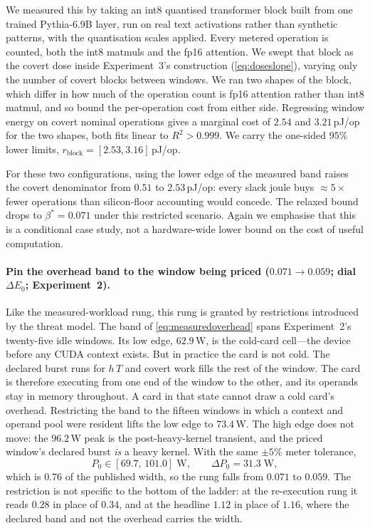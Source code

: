 \documentclass{article}
\theoremstyle{plain}
\theoremstyle{definition}
\theoremstyle{remark}
\begin{document}
We measured this by taking an int8 quantised transformer block built from one trained Pythia-6.9B
layer, run on real text activations rather than synthetic
patterns, with the quantisation scales applied. Every metered operation is
counted, both the int8 matmuls and the fp16 attention. We swept that block
as the covert dose inside Experiment~3's construction
(\cref{eq:doseslope}), varying only the number of covert blocks between
windows. We ran two shapes of the block, which differ in how much of the
operation count is fp16 attention rather than int8 matmul, and so bound the
per-operation cost from either side. Regressing window energy on covert nominal
operations gives a marginal cost of $2.54$ and $3.21$\,pJ/op for the two
shapes, both fits linear to $R^{2} > 0.999$. We carry the one-sided $95\%$ lower limits,
$r_{\mathrm{block}} = [2.53, 3.16]$\,pJ/op.

For these two configurations, using the lower edge of the measured band raises
the covert denominator from $0.51$ to $2.53$\,pJ/op: every slack joule buys
${\approx}5\times$ fewer operations than silicon-floor accounting would
concede. The relaxed bound drops to $\beta^{*} = 0.071$ under this restricted
scenario. Again we emphasise that this is a conditional case study, not a hardware-wide lower bound on
the cost of useful computation.

\paragraph{Pin the overhead band to the window being priced
($0.071 \to 0.059$; dial $\Delta E_0$; Experiment~2).}
Like the measured-workload rung, this rung is granted by restrictions introduced by the threat model. The band of \cref{eq:measuredoverhead} spans Experiment~2's
twenty-five idle windows.  Its low edge, $62.9$\,W, is the cold-card cell---the
device before any CUDA context exists. But in practice the card is not
cold. The declared burst runs for $h\,T$ and covert work fills the rest of the
window. The card is therefore executing from one end of the window to the other,
and its operands stay in memory throughout. A card in that state cannot draw a
cold card's overhead. Restricting
the band to the fifteen windows in which a context and operand pool were
resident lifts the low edge to $73.4$\,W. The high edge does
not move: the $96.2$\,W peak is the post-heavy-kernel transient, and the priced
window's declared burst \emph{is} a heavy kernel. With the same $\pm5\%$ meter
tolerance,
\begin{equation}
	P_0 \in [69.7,\, 101.0]\;\mathrm{W}, \qquad
	\Delta P_0 = 31.3\;\mathrm{W},
	\label{eq:pinnedoverhead}
\end{equation}
which is $0.76$ of the published width, so the rung falls from $0.071$ to
$0.059$. The restriction is not specific to the bottom of the ladder: at the
re-execution rung it reads $0.28$ in place of $0.34$, and at the headline
$1.12$ in place of $1.16$, where the declared band and not the overhead carries
the width.
\end{document}
